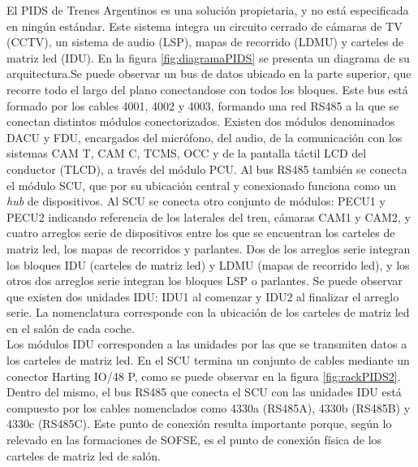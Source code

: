 El PIDS de Trenes Argentinos es una solución propietaria, y no está especificada en ningún estándar. Este sistema integra un circuito cerrado de cámaras de TV (CCTV), un sistema de audio (LSP), mapas de recorrido (LDMU) y carteles de matriz led (IDU). En la figura \ref{fig:diagramaPIDS} se presenta un diagrama de su arquitectura.Se puede observar un bus de datos ubicado en la parte superior, que recorre todo el largo del plano conectandose con todos los bloques. Este bus está formado por los cables 4001, 4002 y 4003, formando una red RS485 a la que se conectan distintos módulos conectorizados. Existen dos módulos denominados DACU y FDU, encargados del micrófono, del audio, de la comunicación con los sistemas CAM T, CAM C, TCMS, OCC y de la pantalla táctil LCD del conductor (TLCD), a través del módulo PCU. Al bus RS485 también se conecta el módulo SCU, que por su ubicación central y conexionado funciona como un \textit{hub} de dispositivos. Al SCU se conecta otro conjunto de módulos: PECU1 y PECU2 indicando referencia de los laterales del tren, cámaras CAM1 y CAM2, y cuatro arreglos serie de dispositivos entre los que se encuentran los carteles de matriz led, los mapas de recorridos y parlantes. Dos de los arreglos serie integran los bloques IDU (carteles de matriz led) y LDMU (mapas de recorrido led), y los otros dos arreglos serie integran los bloques LSP o parlantes. Se puede observar que existen dos unidades IDU: IDU1 al comenzar y IDU2 al finalizar el arreglo serie. La nomenclatura corresponde con la ubicación de los carteles de matriz led en el salón de cada coche. \\

Los módulos IDU corresponden a las unidades por las que se transmiten datos a los carteles de matriz led. En el SCU termina un conjunto de cables mediante un conector Harting IO/48 P, como se puede observar en la figura \ref{fig:rackPIDS2}. Dentro del mismo, el bus RS485 que conecta el SCU con las unidades IDU está compuesto por los cables nomenclados como 4330a (RS485A), 4330b (RS485B) y 4330c (RS485C). Este punto de conexión resulta importante porque, según lo relevado en las formaciones de SOFSE, es el punto de conexión física de los carteles de matriz led de salón.\\

